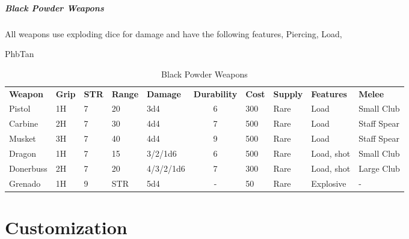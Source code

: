 \documentclass[letterpaper,openany,nodeprecatedcode]{dndbook}
\begin{document}
\begin{multicols}{2}
  \pagebreak
  \subsubsection*{Black Powder Weapons}
  All weapons use exploding dice for damage and have the following features,  Piercing, Load, 

   {} {PhbTan}
  \begin{table}[b]
    \caption{\DndFontTableTitle{}Black Powder Weapons}\label{tab:colors}
    \begin{tabularx}{\linewidth}{llllXcXXXX}
      \textbf{Weapon} & \textbf{Grip} & \textbf{STR} & \textbf{Range} & \textbf{Damage} & \textbf{Durability} & \textbf{Cost} & \textbf{Supply} & \textbf{Features} & \textbf{Melee}\\
      Pistol & 1H & 7 & 20 & 3d4& 6 & 300 & Rare & Load & Small Club \\
      Carbine & 2H & 7 & 30 & 4d4& 7 & 500 & Rare & Load & Staff Spear \\
      Musket & 3H & 7 & 40 & 4d4& 9 & 500 & Rare & Load & Staff Spear \\
      Dragon & 1H & 7 & 15 & 3/2/1d6& 6 & 500 & Rare & Load, shot & Small Club \\
      Donerbuss & 2H & 7 & 20 & 4/3/2/1d6& 7 & 300 & Rare & Load, shot & Large Club \\
      Grenado & 1H & 9 & STR & 5d4& - & 50 & Rare & Explosive & - \\
    \end{tabularx}
  \end{table}
\end{multicols}

\part{Customization}
\end{document}
